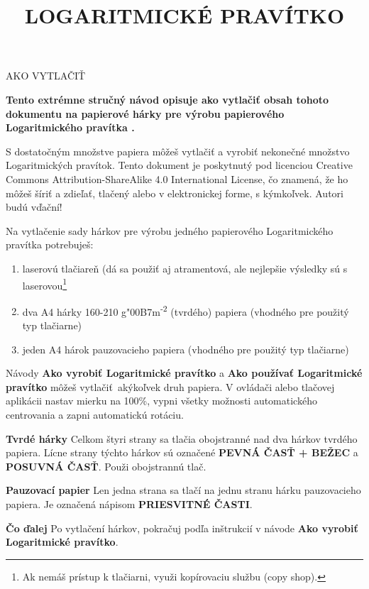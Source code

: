
\newcommand{\makefulltitle}{Ako vytlačiť Logaritmické pravítko }



\title{\fontsize{60}{60}\selectfont LOGARITMICKÉ PRAVÍTKO}
\preauthor{}\postauthor{}\author{}
\predate{}\postdate{}\date{}


  \begin{center}
    \headingfont\fontsize{20}{20}\selectfont AKO VYTLAČIŤ
  \end{center}

  {\let\newpage\relax\maketitle}%
  \nosection{}
  \large\textbf{\makeperex Tento extrémne stručný návod opisuje ako vytlačiť obsah tohoto dokumentu na papierové hárky pre výrobu papierového Logaritmického pravítka \modelname.}

  \begin{multicols*}{3}
  \normalsize{

  S dostatočným množstve papiera môžeš vytlačiť a vyrobiť nekonečné množstvo Logaritmických pravítok. Tento dokument je poskytnutý pod licenciou Creative Commons Attribution-ShareAlike 4.0 International License, čo znamená, že ho môžeš šíriť a zdieľať, tlačený alebo v elektronickej forme, s kýmkoľvek. Autori budú vďační!

  Na vytlačenie sady hárkov pre výrobu jedného papierového Logaritmického pravítka potrebuješ:
    \begin{enumerate}
      \setlength{\parskip}{0pt}
      \setlength{\parsep}{0pt}
      \item laserovú tlačiareň (dá sa použiť aj atramentová, ale nejlepšie výsledky sú s laserovou\footnote{Ak nemáš prístup k tlačiarni, využi kopírovaciu službu (copy shop).}
      \item dva A4 hárky 160-210 g{\char"00B7}m\textsuperscript{-2} (tvrdého) papiera (vhodného pre použitý typ tlačiarne)
      \item jeden A4 hárok pauzovacieho papiera (vhodného pre použitý typ tlačiarne)
    \end{enumerate}

  Návody \textbf{Ako vyrobiť Logaritmické pravítko} a \textbf{Ako používať Logaritmické pravítko} môžeš vytlačiť akýkoľvek druh papiera. V ovládači alebo tlačovej aplikácii nastav mierku na 100\%, vypni všetky možnosti automatického centrovania a zapni automatickú rotáciu.

  \textbf{Tvrdé hárky}
Celkom štyri strany sa tlačia obojstranné nad dva hárkov tvrdého papiera. Lícne strany týchto hárkov sú označené \textbf{PEVNÁ ČASŤ + BEŽEC} a \textbf{POSUVNÁ ČASŤ}. Použi obojstrannú tlač.

  \textbf{Pauzovací papier}
Len jedna strana sa tlačí na jednu stranu hárku pauzovacieho papiera. Je označená nápisom \textbf{PRIESVITNÉ ČASTI}.

  \textbf{Čo ďalej}
Po vytlačení hárkov, pokračuj podľa inštrukcií v návode \textbf{Ako vyrobiť Logaritmické pravítko}.

  }
  \end{multicols*}
  

